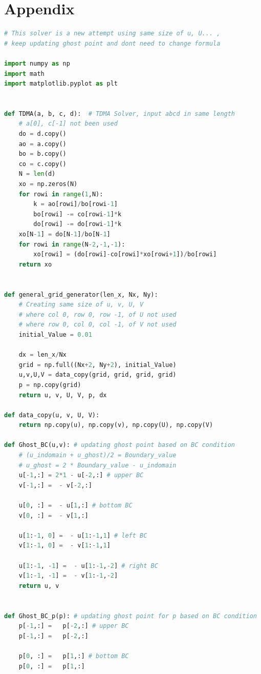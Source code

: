 \documentclass[12pt]{article}
\begin{document}
\section*{Appendix}
\begin{scriptsize}

\begin{lstlisting}[language=python,caption={ADI Solver}]
# This solver is a new attempt using same size of u, U... , 
# keep updating ghost point and dont need to change formula

import numpy as np
import math
import matplotlib.pyplot as plt


def TDMA(a, b, c, d):  # TDMA Solver, input abcd in same length
    # a[0], c[-1] not been used
    do = d.copy()
    ao = a.copy()
    bo = b.copy()
    co = c.copy()
    N = len(d)
    xo = np.zeros(N)
    for rowi in range(1,N):
        k = ao[rowi]/bo[rowi-1]
        bo[rowi] -= co[rowi-1]*k
        do[rowi] -= do[rowi-1]*k
    xo[N-1] = do[N-1]/bo[N-1]
    for rowi in range(N-2,-1,-1):
        xo[rowi] = (do[rowi]-co[rowi]*xo[rowi+1])/bo[rowi]
    return xo


def general_grid_generator(len_x, Nx, Ny):
    # Creating same size of u, v, U, V
    # where col 0, row 0, row -1, of U not used
    # where row 0, col 0, col -1, of V not used
    initial_Value = 0.01

    dx = len_x/Nx
    grid = np.full((Nx+2, Ny+2), initial_Value)
    u,v,U,V = data_copy(grid, grid, grid, grid)
    p = np.copy(grid)
    return u, v, U, V, p, dx

def data_copy(u, v, U, V):
    return np.copy(u), np.copy(v), np.copy(U), np.copy(V)

def Ghost_BC(u,v): # updating ghost point based on BC condition
    # (u_indomain + u_ghost)/2 = Boundary_value
    # u_ghost = 2 * Boundary_value - u_indomain
    u[-1,:] = 2*1 - u[-2,:] # upper BC
    v[-1,:] =  - v[-2,:]

    u[0, :] =  - u[1,:] # bottom BC
    v[0, :] =  - v[1,:]

    u[1:-1, 0] =  - u[1:-1,1] # left BC
    v[1:-1, 0] =  - v[1:-1,1]

    u[1:-1, -1] =  - u[1:-1,-2] # right BC
    v[1:-1, -1] =  - v[1:-1,-2]
    return u, v


def Ghost_BC_p(p): # updating ghost point for p based on BC condition
    p[-1,:] =   p[-2,:] # upper BC
    p[-1,:] =   p[-2,:]

    p[0, :] =   p[1,:] # bottom BC
    p[0, :] =   p[1,:]


\end{lstlisting}
\end{scriptsize}
\end{document}
